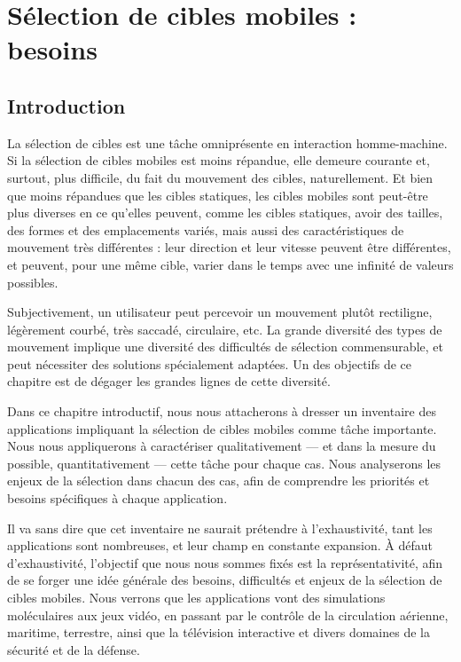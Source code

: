 
\chapter[Sélection de cibles mobiles : besoins]{Sélection de cibles mobiles : besoins}

\setcounter{minitocdepth}{4}
\minitoc
\label{chap1}
\cleardoublepage

	\section{Introduction}
	La sélection de cibles est une tâche omniprésente en interaction homme-machine. Si la sélection de cibles mobiles est moins répandue, elle demeure courante et, surtout, plus difficile, du fait du mouvement des cibles, naturellement. Et bien que moins répandues que les cibles statiques, les cibles mobiles sont peut-être plus diverses en ce qu'elles peuvent, comme les cibles statiques, avoir des tailles, des formes et des emplacements variés, mais aussi des caractéristiques de mouvement très différentes : leur direction et leur vitesse peuvent être différentes, et peuvent, pour une même cible, varier dans le temps avec une infinité de valeurs possibles. 
	
	Subjectivement, un utilisateur peut percevoir un mouvement plutôt rectiligne, légèrement courbé, très saccadé, circulaire, etc. La grande diversité des types de mouvement implique une diversité des difficultés de sélection commensurable, et peut nécessiter des solutions spécialement adaptées. Un des objectifs de ce chapitre est de dégager les grandes lignes de cette diversité.
	
	Dans ce chapitre introductif, nous nous attacherons à dresser un inventaire des applications impliquant la sélection de cibles mobiles comme tâche importante. Nous nous appliquerons à caractériser qualitativement --- et dans la mesure du possible, quantitativement --- cette tâche pour chaque cas. Nous analyserons les enjeux de la sélection dans chacun des cas, afin de comprendre les priorités et besoins spécifiques à chaque application.
	
	Il va sans dire que cet inventaire ne saurait prétendre à l'exhaustivité, tant les applications sont nombreuses, et leur champ en constante expansion. À défaut d'exhaustivité, l'objectif que nous nous sommes fixés est la représentativité, afin de se forger une idée générale des besoins, difficultés et enjeux de la sélection de cibles mobiles. Nous verrons que les applications vont des simulations moléculaires aux jeux vidéo, en passant par le contrôle de la circulation aérienne, maritime, terrestre, ainsi que la télévision interactive et divers domaines de la sécurité et de la défense.

